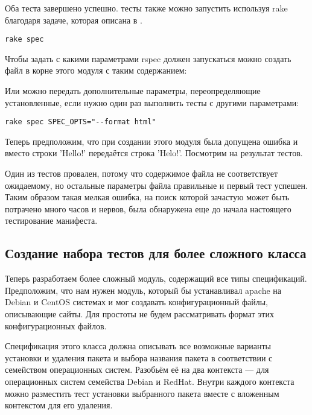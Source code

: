 Оба теста завершено успешно. тесты также можно запустить используя rake благодаря задаче, которая описана в .

\begin{verbatim}
rake spec
\end{verbatim}

Чтобы задать с какими параметрами rspec должен запускаться можно создать файл  в корне этого модуля с таким содержанием:


Или можно передать дополнительные параметры, переопределяющие установленные, если нужно один раз выполнить тесты с другими параметрами:

\begin{verbatim}
rake spec SPEC_OPTS="--format html"
\end{verbatim}

Теперь предположим, что при создании этого модуля была допущена ошибка и вместо строки 'Hello!' передаётся строка 'Helo!'. Посмотрим на результат тестов.



Один из тестов провален, потому что содержимое файла не соответствует ожидаемому, но остальные параметры файла правильные и первый тест успешен. Таким образом такая мелкая ошибка, на поиск которой зачастую может быть потрачено много часов и нервов, была обнаружена еще до начала настоящего тестирование манифеста.

\subsection{Создание набора тестов для более сложного класса}

Теперь разработаем более сложный модуль, содержащий все типы спецификаций. Предположим, что нам нужен модуль, который бы устанавливал apache на Debian и CentOS системах и мог создавать конфигурационный файлы, описывающие сайты. Для простоты не будем рассматривать формат этих конфигурационных файлов.

Спецификация этого класса должна описывать все возможные варианты установки и удаления пакета и выбора названия пакета в соответствии с семейством операционных систем. Разобьём её на два контекста --- для операционных систем семейства Debian и RedHat. Внутри каждого контекста можно разместить тест установки выбранного пакета вместе с вложенным контекстом для его удаления.

